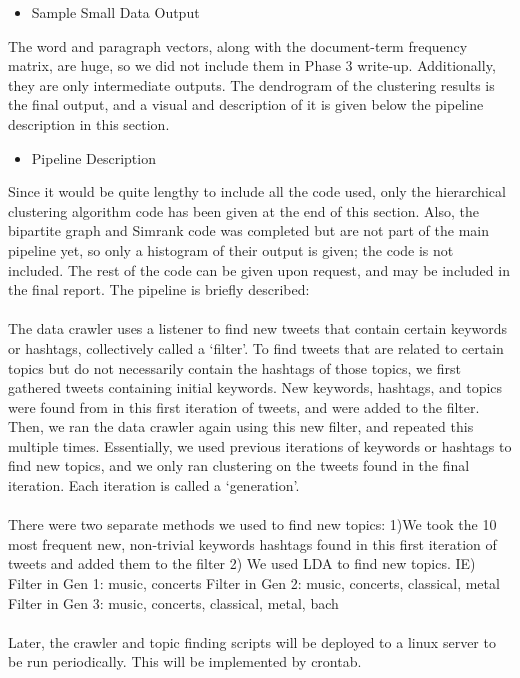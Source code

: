 \documentclass[10pt]{article}
\begin{document}
\begin{itemize}
	\item Sample Small Data Output
\end{itemize}
The word and paragraph vectors, along with the document-term frequency matrix, are huge, so we did not include them in Phase 3 write-up. Additionally, they are only intermediate outputs. The dendrogram of the clustering results is the final output, and a visual and description of it is given below the pipeline description in this section.

\begin{itemize}
	\item Pipeline Description
\end{itemize}
Since it would be quite lengthy to include all the code used, only the hierarchical clustering algorithm code has been given at the end of this section. Also, the bipartite graph and Simrank code was completed but are not part of the main pipeline yet, so only a histogram of their output is given; the code is not included. The rest of the code can be given upon request, and may be included in the final report. The pipeline is briefly described:
\\\\
The data crawler uses a listener to find new tweets that contain certain keywords or hashtags, collectively called a ‘filter’. To find tweets that are related to certain topics but do not necessarily contain the hashtags of those topics, we first gathered tweets containing initial keywords. New keywords, hashtags, and topics were found from in this first iteration of tweets, and were added to the filter. Then, we ran the data crawler again using this new filter, and repeated this multiple times. Essentially, we used previous iterations of keywords or hashtags to find new topics, and we only ran clustering on the tweets found in the final iteration. Each iteration is called a ‘generation’.
\\\\
There were two separate methods we used to find new topics: 
1)We took the 10 most frequent new, non-trivial keywords hashtags found in this first iteration of tweets and added them to the filter 
2) We used LDA to find new topics. 
IE)
Filter in Gen 1: music, concerts
Filter in Gen 2: music, concerts, classical, metal
Filter in Gen 3: music, concerts, classical, metal, bach
\\\\
Later, the crawler and topic finding scripts will be deployed to a linux server to be run periodically. This will be implemented by crontab.
\end{document}
